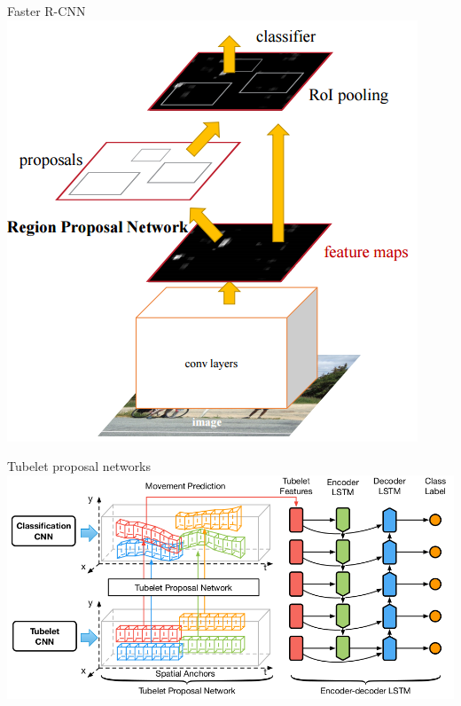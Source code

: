 \documentclass{beamer}
\begin{document}
{%
\begin{frame}{Faster R-CNN}
        \center
        \includegraphics[scale=0.55]{data/faster-rcnn.png}
\end{frame}
}

{%
\begin{frame}{Tubelet proposal networks}
        \includegraphics[scale=0.3]{data/tubelet-proposal-network.png}
\end{frame}
}
\end{document}
